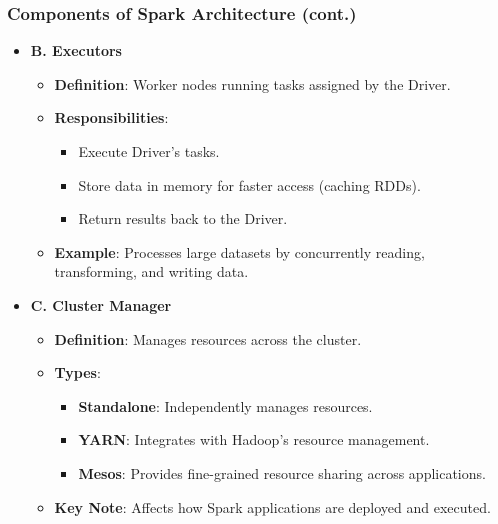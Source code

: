 \documentclass[aspectratio=169]{beamer}
\begin{document}
\begin{frame}[fragile]
    \frametitle{Components of Spark Architecture (cont.)}
    \begin{itemize}
        \item \textbf{B. Executors}
            \begin{itemize}
                \item \textbf{Definition}: Worker nodes running tasks assigned by the Driver.
                \item \textbf{Responsibilities}:
                    \begin{itemize}
                        \item Execute Driver's tasks.
                        \item Store data in memory for faster access (caching RDDs).
                        \item Return results back to the Driver.
                    \end{itemize}
                \item \textbf{Example}: Processes large datasets by concurrently reading, transforming, and writing data.
            \end{itemize}

        \item \textbf{C. Cluster Manager}
            \begin{itemize}
                \item \textbf{Definition}: Manages resources across the cluster.
                \item \textbf{Types}:
                    \begin{itemize}
                        \item \textbf{Standalone}: Independently manages resources.
                        \item \textbf{YARN}: Integrates with Hadoop's resource management.
                        \item \textbf{Mesos}: Provides fine-grained resource sharing across applications.
                    \end{itemize}
                \item \textbf{Key Note}: Affects how Spark applications are deployed and executed.
            \end{itemize}
    \end{itemize}
\end{frame}
\end{document}
